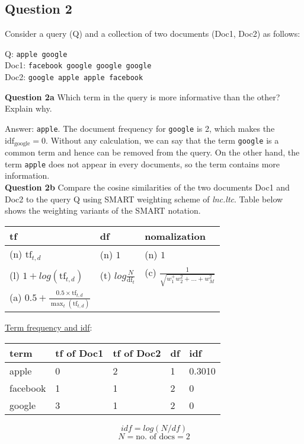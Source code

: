 \documentclass[11pt,a4paper]{report}
\begin{document}
\begin{multicols*}{2}
\section{Question 2}

\noindent Consider a query (Q) and a collection of two documents (Doc1, Doc2) as follows:

\begin{center}
Q: \verb|apple google|\\
Doc1: \verb|facebook google google google|\\
Doc2: \verb|google apple apple facebook|\\
\end{center}

\noindent \textbf{Question 2a} Which term in the query is more informative than the other? Explain why.

\noindent Answer: \verb|apple|. The document frequency for \verb|google| is 2, which makes the $\text{idf}_{\text{google}}=0$. Without any calculation, we can say that the term \verb|google| is a common term and hence can be removed from the query. On the other hand, the term \verb|apple| does not appear in every documents, so the term contains more information.\\

\noindent \textbf{Question 2b} Compare the cosine similarities of the two documents Doc1 and Doc2 to the query Q using SMART weighting scheme of \textit{lnc.ltc}. Table below shows the weighting variants of the SMART notation.

\begin{center}
\begin{tabular}{|l | l | l|}
    \hline
    tf & df & nomalization \\
    \hline
    (n) $\text{tf}_{t,d}$ & (n) $1$ & (n) $1$ \\
    (l) $1 + log(\text{tf}_{t,d})$ & (t) $log \frac{N}{\text{df}_t}$ & (c) $\frac{1}{\sqrt{w_1^ + w_2^2 + \ldots + w_M^2}}$ \\
    (a) $0.5 + \frac{0.5 \times \text{tf}_{t,d}}{\max_t (\text{tf}_{t,d})}$ & & \\
    \hline
\end{tabular}
\end{center}



\noindent\underline{Term frequency and idf}:

\begin{center}
\begin{tabular}{|l | l | l | l | l|}
    \hline
    term     & tf of Doc1 & tf of Doc2 & df & idf \\
    \hline
    apple    & 0 & 2 & 1 & 0.3010\\
    facebook & 1 & 1 & 2 & 0\\
    google   & 3 & 1 & 2 & 0\\
    \hline
\end{tabular}
\end{center}
$$ idf = log(N / df) $$
$$ N = \text{no. of docs} = 2$$


\end{multicols*}
\end{document}
